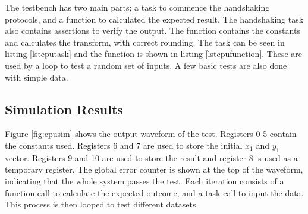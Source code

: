 The testbench has two main parts; a task to commence the handshaking protocols, and a function to calculated the expected result. 
The handshaking task also contains assertions to verify the output. 
The function contains the constants and calculates the transform, with correct rounding.
The task can be seen in listing \ref{lstcputask} and the function is shown in listing \ref{lstcpufunction}.
These are used by a loop to test a random set of inputs. 
A few basic tests are also done with simple data. 







\subsection{Simulation Results}

Figure \ref{fig:cpusim} shows the output waveform of the test. 
Registers 0-5 contain the constants used. 
Registers 6 and 7 are used to store the initial $x_1$ and $y_1$ vector. 
Registers 9 and 10 are used to store the result and register 8 is used as a temporary register. 
The global error counter is shown at the top of the waveform, indicating that the whole system passes the test. 
Each iteration consists of a function call to calculate the expected outcome, and a task call to input the data. 
This process is then looped to test different datasets. 

